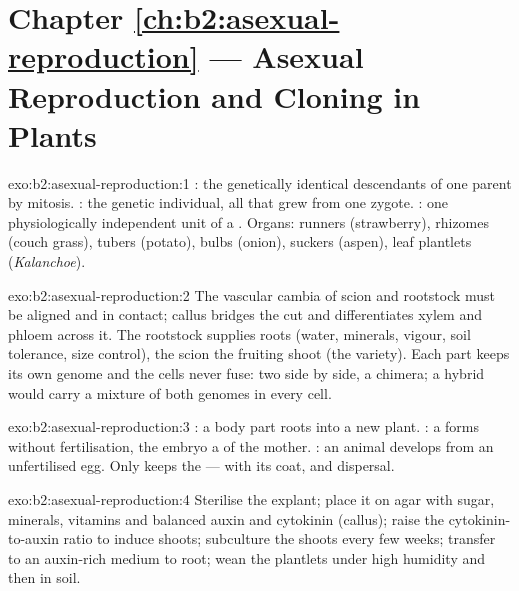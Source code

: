 \section*{Chapter \ref{ch:b2:asexual-reproduction} --- Asexual Reproduction and Cloning in Plants}

\begin{solution}{exo:b2:asexual-reproduction:1}
: the genetically identical descendants of one parent by
mitosis. : the genetic individual, all that grew from one
zygote. : one physiologically independent unit of a .
Organs: runners (strawberry), rhizomes (couch grass), tubers
(potato), bulbs (onion), suckers (aspen), leaf plantlets
(\emph{Kalanchoe}).
\end{solution}

\begin{solution}{exo:b2:asexual-reproduction:2}
The vascular cambia of scion and rootstock must be aligned and in
contact; callus bridges the cut and differentiates xylem and phloem
across it. The rootstock supplies roots (water, minerals, vigour,
soil tolerance, size control), the scion the fruiting shoot (the
variety). Each part keeps its own genome and the cells never fuse:
two  side by side, a chimera; a hybrid would carry a
mixture of both genomes in every cell.
\end{solution}

\begin{solution}{exo:b2:asexual-reproduction:3}
: a body part roots into a new plant.
: a  forms without fertilisation, the embryo a  of
the mother. : an animal develops from an unfertilised
egg. Only  keeps the  --- with its coat,  and
dispersal.
\end{solution}

\begin{solution}{exo:b2:asexual-reproduction:4}
Sterilise the explant; place it on agar with sugar, minerals,
vitamins and balanced auxin and cytokinin (callus); raise the
cytokinin-to-auxin ratio to induce shoots; subculture the shoots
every few weeks; transfer to an auxin-rich medium to root; wean the
plantlets under high humidity and then in soil.
\end{solution}

